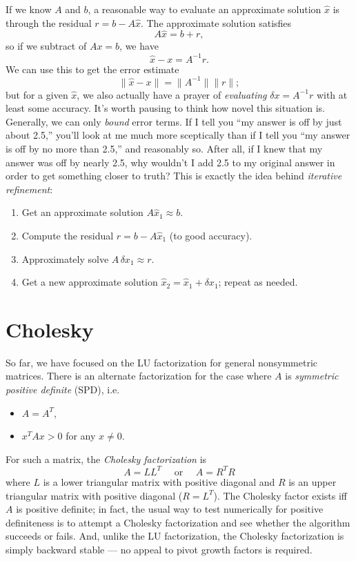 \documentclass[12pt, leqno]{article}
\begin{document}
If we know $A$ and $b$, a reasonable way to evaluate an approximate
solution $\hat{x}$ is through the residual $r = b-A\hat{x}$.  The
approximate solution satisfies
\[
  A \hat{x} = b + r,
\]
so if we subtract of $Ax = b$, we have
\[
  \hat{x}-x = A^{-1} r.
\]
We can use this to get the error estimate
\[
  \|\hat{x}-x\| = \|A^{-1}\| \|r\|;
\]
but for a given $\hat{x}$, we also actually have a prayer of {\em evaluating}
$\delta x = A^{-1} r$ with at least some accuracy.
%
It's worth pausing to think how novel this situation is.
Generally, we can only {\em bound} error terms.
If I tell you ``my answer is off by just about 2.5,''
you'll look at me much more sceptically than if I tell
you ``my answer is off by no more than 2.5,'' and reasonably so.
After all, if I knew that my answer was off by nearly 2.5, why wouldn't
I add 2.5 to my original answer in order to get something closer to truth?
This is exactly the idea behind {\em iterative refinement}:
\begin{enumerate}
\item
  Get an approximate solution $A \hat{x}_1 \approx b$.
\item
  Compute the residual $r = b-A\hat{x}_1$ (to good accuracy).
\item
  Approximately solve $A \, \delta x_1 \approx r$.
\item
  Get a new approximate solution $\hat{x}_2 = \hat{x}_1+\delta x_1$;
  repeat as needed.
\end{enumerate}

\section{Cholesky}

So far, we have focused on the LU factorization for general
nonsymmetric matrices.  There is an alternate factorization
for the case where $A$ is {\em symmetric positive definite} (SPD),
i.e.
\begin{itemize}
\item $A = A^T$,
\item $x^T A x > 0$ for any $x \neq 0$.
\end{itemize}
For such a matrix, the {\em Cholesky factorization} is
\[
  A = LL^T \quad \mbox{ or } \quad A = R^T R
\]
where $L$ is a lower triangular matrix with positive diagonal and $R$
is an upper triangular matrix with positive diagonal ($R = L^T$).  The
Cholesky factor exists iff $A$ is positive definite; in fact, the
usual way to test numerically for positive definiteness is to attempt
a Cholesky factorization and see whether the algorithm succeeds or
fails.  And, unlike the LU factorization, the Cholesky factorization
is simply backward stable --- no appeal to pivot growth factors is required.
\end{document}
